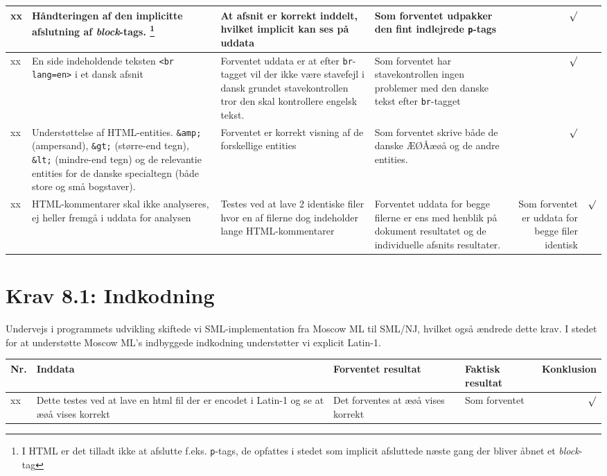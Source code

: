 \documentclass[a4paper,oneside,article]{memoir}
\begin{document}
\begin{landscape}
\begin{longtable}[c]{p{20pt}|p{220pt}|p{130pt}|p{130pt}|r}
xx &
Håndteringen af den implicitte afslutning af
  \textit{block}-tags. 
\footnote{I HTML er det tilladt ikke at afslutte f.eks. \texttt{p}-tags, de opfattes i stedet som implicit afsluttede næste gang der bliver åbnet et \textit{block}-tag}&
At afsnit er korrekt inddelt, hvilket implicit kan ses på uddata &
Som forventet udpakker den fint indlejrede \texttt{p}-tags &
 $\surd$ \\ \hline

xx &
En side indeholdende teksten \texttt{<br lang=en>} i et dansk afsnit &
Forventet uddata er at efter \texttt{br}-tagget vil der ikke være stavefejl i dansk grundet stavekontrollen tror den skal kontrollere engelsk tekst. &
Som forventet har stavekontrollen ingen problemer med den danske tekst efter \texttt{br}-tagget &
 $\surd$ \\ \hline

xx &
Understøttelse af HTML-entities. 
\texttt{\&amp;} (ampersand), \texttt{\&gt;} (større-end tegn), \texttt{\&lt;}
  (mindre-end tegn) og de relevantie entities for de danske
  specialtegn (både store og små bogstaver). &
Forventet er korrekt visning af de forskellige entities &
Som forventet skrive både de danske ÆØÅæøå og de andre entities. &
 $\surd$ \\ \hline

xx &
HTML-kommentarer skal ikke analyseres, ej heller fremgå i uddata for analysen &
Testes ved at lave 2 identiske filer hvor en af filerne dog indeholder lange HTML-kommentarer &
Forventet uddata for begge filerne er ens med henblik på dokument resultatet og de individuelle afsnits resultater. &
Som forventet er uddata for begge filer identisk &
$\surd$ \\ \hline

\end{longtable}

\section{Krav 8.1: Indkodning}

Undervejs i programmets udvikling skiftede vi SML-implementation fra
Moscow ML til SML/NJ, hvilket også ændrede dette krav. I stedet for at
understøtte Moscow ML's indbyggede indkodning understøtter vi explicit
Latin-1.

\begin{longtable}[c]{p{20pt}|p{220pt}|p{130pt}|p{130pt}|r}
\textbf{Nr.} &
\textbf{Inddata} &
\textbf{Forventet resultat} &
\textbf{Faktisk resultat} &
\textbf{Konklusion} \\ \hline

xx &
Dette testes ved at lave en html fil der er encodet i Latin-1 og se at æøå vises korrekt &
Det forventes at æøå vises korrekt &
Som forventet &
$\surd$ \\ \hline

\end{longtable}
\end{landscape}
\end{document}
